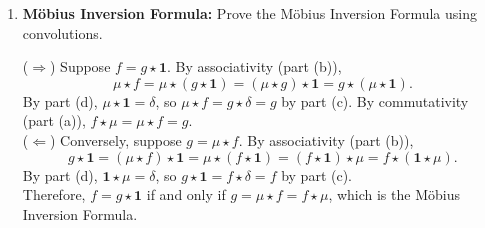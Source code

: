 \begin{enumerate}
\begin{enumerate}
    \item \textbf{Möbius Inversion Formula:} Prove the Möbius Inversion Formula using convolutions.\newline
    [Hint: Theorem 3.5 can be restated as $f=g \star \mathbf{1}$ if and only if $g=\mu \star f=f \star \mu$.]
    \begin{subprove}
      ($\Rightarrow$) Suppose $f = g \star \mathbf{1}$. By associativity (part (b)),
      \[
      \mu \star f = \mu \star (g \star \mathbf{1}) = (\mu \star g) \star \mathbf{1} = g \star (\mu \star \mathbf{1}).
      \]
      By part (d), $\mu \star \mathbf{1} = \delta$, so $\mu \star f = g \star \delta = g$ by part (c). By commutativity (part (a)), $f \star \mu = \mu \star f = g$.
      \vspace*{10px}\\
      ($\Leftarrow$) Conversely, suppose $g = \mu \star f$. By associativity (part (b)),
      \[
      g \star \mathbf{1} = (\mu \star f) \star \mathbf{1} = \mu \star (f \star \mathbf{1}) = (f \star \mathbf{1}) \star \mu = f \star (\mathbf{1} \star \mu).
      \]
      By part (d), $\mathbf{1} \star \mu = \delta$, so $g \star \mathbf{1} = f \star \delta = f$ by part (c).
      \vspace*{10px}\\
      Therefore, $f = g \star \mathbf{1}$ if and only if $g = \mu \star f = f \star \mu$, which is the Möbius Inversion Formula.
    \end{subprove}
  \end{enumerate}

\end{enumerate}

















